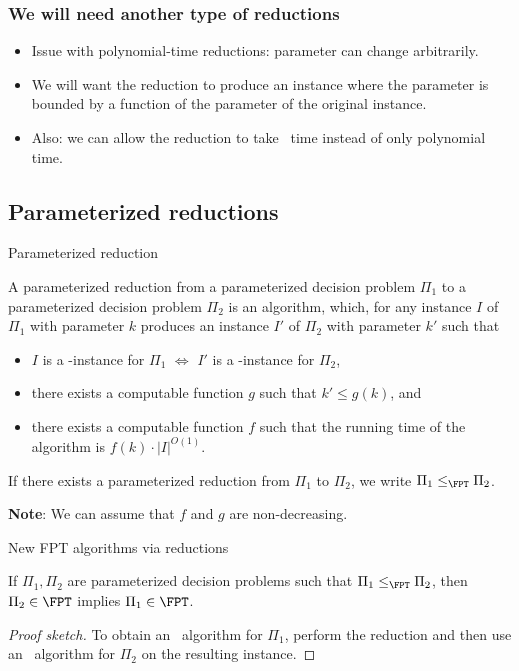 \begin{frame}
 \frametitle{We will need another type of reductions}
 
 \begin{itemize}
  \item Issue with polynomial-time reductions: parameter can change arbitrarily.
  \pause
  \item We will want the reduction to produce an instance where the parameter is bounded by a function of the parameter of the original instance.
  \smallskip
  \pause
  \item Also: we can allow the reduction to take \FPT\ time instead of only polynomial time.
 \end{itemize}
 
\end{frame}


\subsection{Parameterized reductions}


\begin{frame}{Parameterized reduction}
 \begin{definition}
 	A \alert{parameterized reduction} from a parameterized decision problem $\Pi_1$ to a parameterized decision problem $\Pi_2$ is an algorithm, which, for any instance $I$ of $\Pi_1$ with parameter $k$ produces an instance $I'$ of $\Pi_2$ with parameter $k'$ such that
 	\begin{itemize}
 		\item $I$ is a \Yes-instance for $\Pi_1$ $\Leftrightarrow$ $I'$ is a \Yes-instance for $\Pi_2$,
 		\item there exists a computable function $g$ such that $k'\le g(k)$, and
 		\item there exists a computable function $f$ such that the running time of the algorithm is $f(k) \cdot |I|^{O(1)}$.
  	\end{itemize}
 	If there exists a parameterized reduction from $\Pi_1$ to $\Pi_2$, we write $\Pi_1 \le_{\FPT} \Pi_2$.
 \end{definition}
 
 \noindent
 \textbf{Note}: We can assume that $f$ and $g$ are non-decreasing.
\end{frame}


\begin{frame}{New FPT algorithms via reductions}
	
	\begin{lemma}
		If $\Pi_1, \Pi_2$ are parameterized decision problems such that $\Pi_1 \le_{\FPT} \Pi_2$, then\\ $\Pi_2 \in \FPT$ implies $\Pi_1\in \FPT$.
	\end{lemma}
	\begin{proof}[Proof sketch]
		To obtain an \FPT\ algorithm for $\Pi_1$, perform the reduction and then use an \FPT\ algorithm for $\Pi_2$ on the resulting instance.
	\end{proof}
	
\end{frame}



